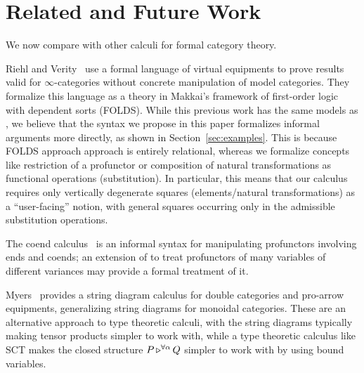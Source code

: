 \documentclass{llncs}
\begin{document}
\section{Related and Future Work}
\label{sec:discussion}

We now compare \vett{} with other calculi for formal category theory.  

Riehl and Verity~\cite{riehl_verity_2022} use a formal language of virtual
equipments to prove results valid for $\infty$-categories without
concrete manipulation of model categories. They formalize this language
as a theory in Makkai's framework of first-order logic with dependent
sorts (FOLDS).  While this previous work has the same models as \vett{},
we believe that the syntax we propose in this paper formalizes informal
arguments more directly, as shown in Section~\ref{sec:examples}.  This
is because FOLDS approach approach is entirely relational, whereas we
formalize concepts like restriction of a profunctor or composition of
natural transformations as functional operations (substitution).  In
particular, this means that our calculus requires only vertically
degenerate squares (elements/natural transformations) as a
``user-facing'' notion, with general squares occurring only in the
admissible substitution operations.


The coend calculus~\citet{loregian_2021} is an informal syntax for
manipulating profunctors involving ends and coends; an extension of
\vett{} to treat profunctors of many variables of different variances
may provide a formal treatment of it.

Myers~\citet{jazmyers-strings} provides a string diagram calculus for
double categories and pro-arrow equipments, generalizing string
diagrams for monoidal categories. These are an
alternative approach to type theoretic calculi, with the string
diagrams typically making tensor products simpler to work with, while
a type theoretic calculus like SCT makes the closed structure
$P \mathop{\triangleright^{\forall \alpha}} Q$ simpler to work with by using bound
variables.
\end{document}
